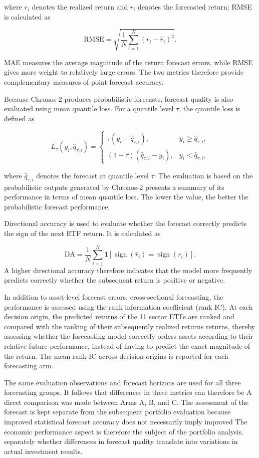 \documentclass[12pt,a4paper,twoside,openany]{book}
\begin{document}
where \(r_i\) denotes the realized return and \(\hat{r}_i\) denotes the
forecasted return; RMSE is calculated as

\[
\mathrm{RMSE}
=
\sqrt{
\frac{1}{N}
\sum_{i=1}^{N}
\left(r_i-\hat{r}_i\right)^2
}.
\]

MAE measures the average magnitude of the return forecast errors,
while RMSE gives more weight to relatively large errors. The two
metrics therefore provide complementary measures of point-forecast
accuracy.

Because Chronos-2 produces probabilistic forecasts, forecast quality is
also evaluated using mean quantile loss. For a quantile level
\(\tau\), the quantile loss is defined as

\[
L_{\tau}(y_i,\hat{q}_{\tau,i})
=
\begin{cases}
\tau (y_i-\hat{q}_{\tau,i}),
& y_i \geq \hat{q}_{\tau,i}, \\[4pt]
(1-\tau)(\hat{q}_{\tau,i}-y_i),
& y_i < \hat{q}_{\tau,i},
\end{cases}
\]

where \(\hat{q}_{\tau,i}\) denotes the forecast at quantile level \(\tau\).
The evaluation is based on the probabilistic outputs generated by
Chronos-2 presents a summary of its performance in terms of mean quantile loss.
The lower the value, the better the probabilistic forecast performance.

Directional accuracy is used to evaluate whether the forecast correctly
predicts the sign of the next ETF return. It is calculated as

\[
\mathrm{DA}
=
\frac{1}{N}
\sum_{i=1}^{N}
\mathbf{1}
\left[
\operatorname{sign}(\hat{r}_i)
=
\operatorname{sign}(r_i)
\right].
\]
A higher directional accuracy therefore indicates that the model more
frequently predicts correctly whether the subsequent return is positive
or negative.

In addition to asset-level forecast errors, cross-sectional forecasting,
the performance is assessed using the rank information coefficient (rank IC).
At each decision origin, the predicted returns of the 11 sector ETFs
are ranked and compared with the ranking of their subsequently realized returns
returns, thereby assessing whether the forecasting model
correctly orders assets according to their relative future performance,
instead of having to predict the exact magnitude of the return. The
mean rank IC across decision origins is reported for each forecasting arm.

The same evaluation observations and forecast horizons are used for all
three forecasting groups. It follows that differences in these metrics can therefore be
A direct comparison was made between Arms A, B, and C. The assessment of the forecast is
kept separate from the subsequent portfolio evaluation because improved
statistical forecast accuracy does not necessarily imply improved
The economic performance aspect is therefore the subject of the portfolio analysis.
separately whether differences in forecast quality translate into
variations in actual investment results.
\end{document}
